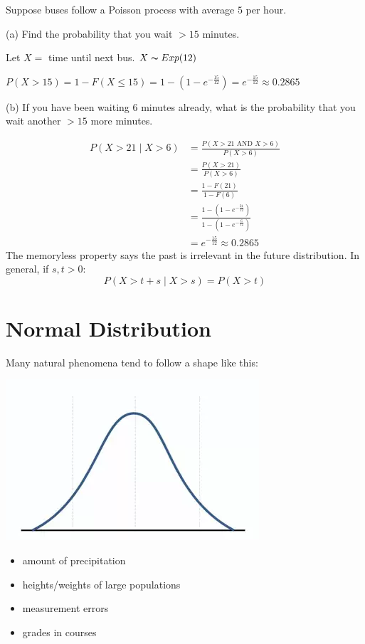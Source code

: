 Suppose buses follow a Poisson process with average $ 5 $ per hour.

(a) Find the probability that you wait $ >15 $ minutes.

Let $ X= $ time until next bus. $ X \thicksim Exp(12) $

$ P(X>15)=1-F(X\le 15)=1-\left(1-e^{-\frac{15}{12}}\right)= e^{-\frac{15}{12}}
    \approx 0.2865$

(b) If you have been waiting 6 minutes already, what is the probability
that you wait another $ >15 $ more minutes.

\begin{align*}
    P(X>21\mid X>6) & =\frac{P(X>21\text{ AND } X>6)}{P(X>6)}                   \\
                    & =\frac{P(X>21)}{P(X>6)}                                   \\
                    & =\frac{1-F(21)}{1-F(6)}                                   \\
                    & =\frac{1-(1-e^{-\frac{21}{12}})}{1-(1-e^{-\frac{6}{12}})} \\
                    & =e^{-\frac{15}{12}}\approx 0.2865
\end{align*}
The memoryless property says the past is irrelevant in the future distribution.
In general, if $ s,t>0 $:
\[ P(X>t+s\mid X>s)=P(X>t) \]

\setcounter{section}{4}
\section{Normal Distribution}
Many natural phenomena tend to follow a shape like this:

\begin{center}
    \includegraphics{gaussian.png}
\end{center}

\begin{itemize}
    \item amount of precipitation
    \item heights/weights of large populations
    \item measurement errors
    \item grades in courses
\end{itemize}

